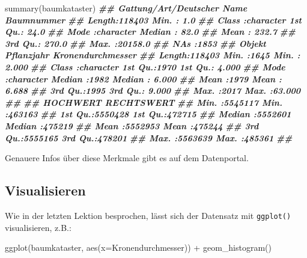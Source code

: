 \documentclass[11pt,german,a4paper]{article}
\newenvironment{Shaded}{\begin{snugshade}}{\end{snugshade}}
\newcommand{\AttributeTok}[1]{\textcolor[rgb]{0.77,0.63,0.00}{#1}}
\newcommand{\DocumentationTok}[1]{\textcolor[rgb]{0.56,0.35,0.01}{\textbf{\textit{#1}}}}
\newcommand{\FunctionTok}[1]{\textcolor[rgb]{0.00,0.00,0.00}{#1}}
\newcommand{\NormalTok}[1]{#1}
\newcommand{\SpecialCharTok}[1]{\textcolor[rgb]{0.00,0.00,0.00}{#1}}
\begin{document}
\begin{Shaded}
\begin{Highlighting}[]
\FunctionTok{summary}\NormalTok{(baumkataster)}
\DocumentationTok{\#\#  Gattung/Art/Deutscher Name   Baumnummer     }
\DocumentationTok{\#\#  Length:118403              Min.   :    1.0  }
\DocumentationTok{\#\#  Class :character           1st Qu.:   24.0  }
\DocumentationTok{\#\#  Mode  :character           Median :   82.0  }
\DocumentationTok{\#\#                             Mean   :  232.7  }
\DocumentationTok{\#\#                             3rd Qu.:  270.0  }
\DocumentationTok{\#\#                             Max.   :20158.0  }
\DocumentationTok{\#\#                             NA\textquotesingle{}s   :1853     }
\DocumentationTok{\#\#     Objekt            Pflanzjahr   Kronendurchmesser}
\DocumentationTok{\#\#  Length:118403      Min.   :1645   Min.   : 2.000   }
\DocumentationTok{\#\#  Class :character   1st Qu.:1970   1st Qu.: 4.000   }
\DocumentationTok{\#\#  Mode  :character   Median :1982   Median : 6.000   }
\DocumentationTok{\#\#                     Mean   :1979   Mean   : 6.688   }
\DocumentationTok{\#\#                     3rd Qu.:1995   3rd Qu.: 9.000   }
\DocumentationTok{\#\#                     Max.   :2017   Max.   :63.000   }
\DocumentationTok{\#\#                                                     }
\DocumentationTok{\#\#     HOCHWERT         RECHTSWERT    }
\DocumentationTok{\#\#  Min.   :5545117   Min.   :463163  }
\DocumentationTok{\#\#  1st Qu.:5550428   1st Qu.:472715  }
\DocumentationTok{\#\#  Median :5552601   Median :475219  }
\DocumentationTok{\#\#  Mean   :5552953   Mean   :475244  }
\DocumentationTok{\#\#  3rd Qu.:5555165   3rd Qu.:478201  }
\DocumentationTok{\#\#  Max.   :5563639   Max.   :485361  }
\DocumentationTok{\#\# }
\end{Highlighting}
\end{Shaded}

Genauere Infos über diese Merkmale gibt es auf dem Datenportal.

\hypertarget{visualisieren}{%
\subsection{Visualisieren}\label{visualisieren}}

Wie in der letzten Lektion besprochen, lässt sich der Datensatz mit \texttt{ggplot()} visualisieren, z.B.:

\begin{Shaded}
\begin{Highlighting}[]
\FunctionTok{ggplot}\NormalTok{(baumkataster, }\FunctionTok{aes}\NormalTok{(}\AttributeTok{x=}\NormalTok{Kronendurchmesser)) }\SpecialCharTok{+}
  \FunctionTok{geom\_histogram}\NormalTok{()}
\end{Highlighting}
\end{Shaded}
\end{document}
